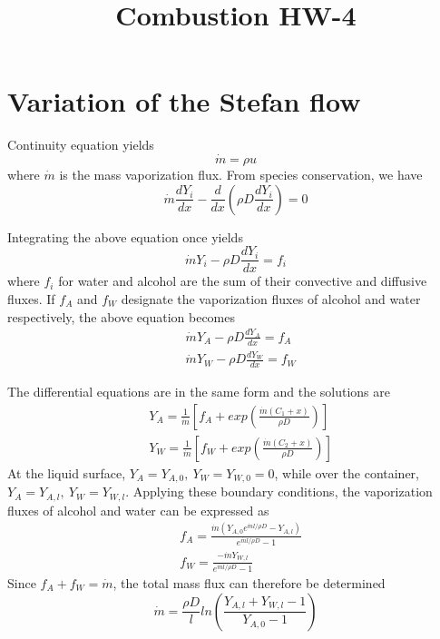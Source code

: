 \documentclass{article}
\title{Combustion HW-4}
\author{}
\date{}
\begin{document}
\maketitle

\section{Variation of the Stefan flow}
Continuity equation yields
\begin{equation}
    \dot{m} = \rho u
\end{equation}
where $\dot{m}$ is the mass vaporization flux. From species conservation, we have
\begin{equation}
    \dot{m}\frac{dY_i}{dx}-\frac{d}{dx}(\rho D \frac{dY_i}{dx})=0
\end{equation}

Integrating the above equation once yields
\begin{equation}
    \dot{m} Y_i-\rho D \frac{dY_i}{dx}=f_i
\end{equation}
where $f_i$ for water and alcohol are the sum of their convective and diffusive fluxes. If $f_A$ and $f_W$ designate the vaporization fluxes of alcohol and water respectively, the above equation becomes
\begin{equation}
\begin{aligned}
    & \dot{m} Y_A-\rho D \frac{dY_A}{dx}=f_A \\
    & \dot{m} Y_W-\rho D \frac{dY_W}{dx}=f_W
\end{aligned}
\end{equation}

The differential equations are in the same form and the solutions are
\begin{equation}
\begin{aligned}
    & Y_A = \frac{1}{\dot{m}}[f_A+exp(\frac{\dot{m}(C_1+x)}{\rho D})] \\
    & Y_W = \frac{1}{\dot{m}}[f_W+exp(\frac{\dot{m}(C_2+x)}{\rho D})]
\end{aligned}
\end{equation}
At the liquid surface, $Y_A=Y_{A,0},\ Y_W=Y_{W,0}=0$, while over the container, $Y_A=Y_{A,l},\ Y_W=Y_{W,l}$. Applying these boundary conditions, the vaporization fluxes of alcohol and water can be expressed as
\begin{equation}
\begin{aligned}
    & f_A=\frac{\dot{m}(Y_{A,0}e^{\dot{m}l/\rho D}-Y_{A,l})}{e^{\dot{m}l/\rho D}-1} \\
    & f_W=\frac{-\dot{m}Y_{W,l}}{e^{\dot{m}l/\rho D}-1}
\end{aligned}
\end{equation}
Since $f_A+f_W=\dot{m}$, the total mass flux can therefore be determined
\begin{equation}
    \dot{m}=\frac{\rho D}{l}ln(\frac{Y_{A,l}+Y_{W,l}-1}{Y_{A,0}-1})
\end{equation}
\end{document}
